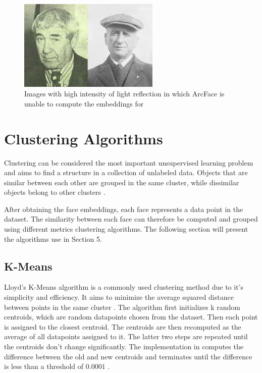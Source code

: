 \documentclass[12pt,english]{article}
\begin{document}
\begin{figure}[!tbp]
 \centering
    \includegraphics[width=0.6\textwidth]{figures/ex.png}
    \caption{Images with high intensity of light reflection in which ArcFace is unable to compute the embeddings for \cite{chinapas}}
	\label{fig:arcface2}
\end{figure}

\section{Clustering Algorithms}

\quad
Clustering can be considered the most important unsupervised learning problem and aims to find a structure in a collection of unlabeled data. Objects that are similar between each other are grouped in the same cluster, while dissimilar objects belong to other clusters \cite{ncbi}.


After obtaining the face embeddings, each face represents a data point in the dataset. The similarity between each face can therefore be computed and grouped using different metrics clustering algorithms. The following section will present the algorithms use in Section 5. 

\subsection{K-Means}

\quad
Lloyd’s K-Means algorithm is a commonly used clustering method due to it's simplicity and efficiency. It aims to minimize the average squared distance between points in the same cluster \cite{kmeans}. The algorithm first initializes k random centroids, which are random datapoints chosen from the dataset. Then each point is assigned to the closest centroid. The centroids are then recomputed as the average of all datapoints assigned to it. The latter two steps are repeated until the centroids don't change significantly. The implementation in \cite{scikit-learn} computes the difference between the old and new centroids and terminates until the difference is less than a threshold of $0.0001$ \cite{kmeans}.
\end{document}
